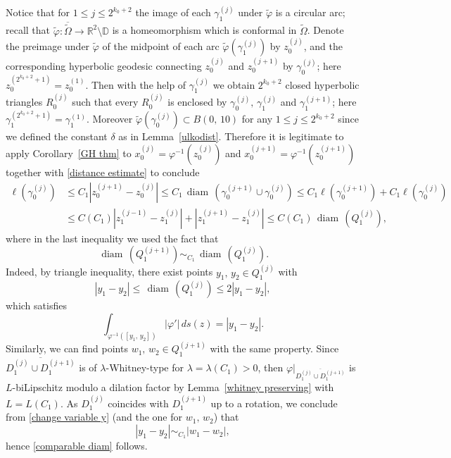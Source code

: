 \documentclass[reqno,11pt]{amsart}
\def\wz{\widetilde}
\def\diam{{\mathop\mathrm{\,diam\,}}}
\numberwithin{equation}{section}
\theoremstyle{remark}
\begin{document}
Notice that for $1\le j\le 2^{k_0+2}$ the image of each $\gamma^{(j)}_1$ 
under $\wz \varphi$ is a circular arc; 
recall that 
$\wz \varphi\colon \overline{\wz \Omega} 
\to \mathbb R^2\setminus \mathbb D$ is a homeomorphism which is conformal 
in $\wz \Omega$. Denote the preimage under $\wz \varphi$ of the midpoint of 
each arc $\wz \varphi(\gamma_1^{(j)})$ by $z^{(j)}_0$, and the 
corresponding hyperbolic geodesic connecting $z_0^{(j)}$ and $z_0^{(j+1)}$ 
by $\gamma^{(j)}_0$; here $z_0^{(2^{k_0+2}+1)}=z_0^{(1)}$. 
Then with the help of $\gamma^{(j)}_1$ we obtain    $2^{k_0+2}$ closed hyperbolic 
triangles $R_{0}^{(j)}$ such that every $R_{0}^{(j)}$ is enclosed by 
$\gamma_0^{(j)},\,\gamma_{1}^{(j)}$ and $\gamma_{1}^{(j+1)}$; 
here $\gamma_{1}^{(2^{k_0+2}+1)}=\gamma_{1}^{(1)}$. 
Moreover $\wz\varphi(\gamma_0^{(j)})\subset B(0,\,10)$ for any 
$1\le j\le 2^{k_0+2}$ since we defined the constant $\delta$ as in Lemma~\ref{ulkodist}. 
Therefore it is legitimate to apply Corollary~\ref{GH thm}   to $x^{(j)}_0=\varphi^{-1}(z^{(j)}_0)$ and $x^{(j+1)}_0=\varphi^{-1}(z^{(j+1)}_0)$ together with \eqref{distance estimate} to conclude
\begin{align}\label{distance estimate2}
\ell(\gamma^{(j)}_0)&\le C_1 |z^{(j+1)}_0-z^{(j)}_0|\le C_1 \diam(\gamma_0^{(j+1)}\cup \gamma_0^{(j)})\le C_1 \ell(\gamma_0^{(j+1)})+ C_1 \ell( \gamma_0^{(j)})\nonumber\\
&\le C(C_1) |z^{(j-1)}_1-z^{(j)}_1| + |z^{(j+1)}_1-z^{(j)}_1|\le C(C_1)   \diam(Q^{(j)}_1),
\end{align}
where in the last inequality we used the fact that 
\begin{equation}\label{comparable diam}
    \diam(Q^{(j+1)}_1) \sim_{C_1} \diam(Q^{(j)}_1).
\end{equation} 
Indeed, by triangle inequality, there exist points $y_1,\,y_2\in Q^{(j)}_1$ with
$$|y_1-y_2|\le \diam(Q^{(j)}_1)\le 2|y_1-y_2|,$$
which satisfies
\begin{equation}\label{change variable y}
\int_{\varphi^{-1}([y_1,\,y_2])} |\varphi'|\,ds(z)=|y_1-y_2|.
\end{equation}
Similarly, we can find points $w_1,\,w_2\in Q^{(j+1)}_1$ with the same property. Since $\overline{D^{(j)}_1\cup D^{(j+1)}_1}$ is of $\lambda$-Whitney-type for $\lambda=\lambda(C_1)>0$, then $\varphi|_{\overline{D^{(j)}_1\cup D^{(j+1)}_1}}$ is $L$-biLipschitz modulo a dilation factor by Lemma~\ref{whitney preserving} with $L=L(C_1)$. As $D^{(j)}_1$ coincides with $D^{(j+1)}_1$ up to a rotation, we conclude from \eqref{change variable y} (and the one for $w_1,\,w_2$) that
$$|y_1-y_2|\sim_{C_1}|w_1-w_2|,$$
 hence \eqref{comparable diam} follows. 
\end{document}
